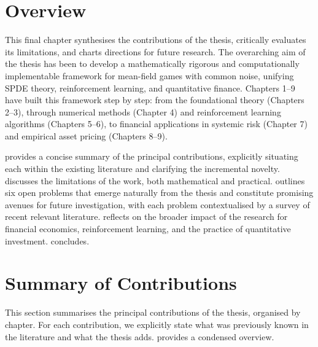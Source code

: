 
\section{Overview}

This final chapter synthesises the contributions of the thesis, critically evaluates
its limitations, and charts directions for future research. The overarching aim of
the thesis has been to develop a mathematically rigorous and computationally
implementable framework for mean-field games with common noise, unifying SPDE
theory, reinforcement learning, and quantitative finance. Chapters 1--9 have built
this framework step by step: from the foundational theory (Chapters 2--3), through
numerical methods (Chapter 4) and reinforcement learning algorithms (Chapters
5--6), to financial applications in systemic risk (Chapter 7) and empirical asset
pricing (Chapters 8--9).

 provides a concise summary of the principal
contributions, explicitly situating each within the existing literature and
clarifying the incremental novelty.  discusses the
limitations of the work, both mathematical and practical. 
outlines six open problems that emerge naturally from the thesis and constitute
promising avenues for future investigation, with each problem contextualised by a
survey of recent relevant literature.  reflects on the broader
impact of the research for financial economics, reinforcement learning, and the
practice of quantitative investment.  concludes.


\section{Summary of Contributions}
\label{sec:syn-contributions}

This section summarises the principal contributions of the thesis, organised by
chapter. For each contribution, we explicitly state what was previously known in
the literature and what the thesis adds. 
provides a condensed overview.

